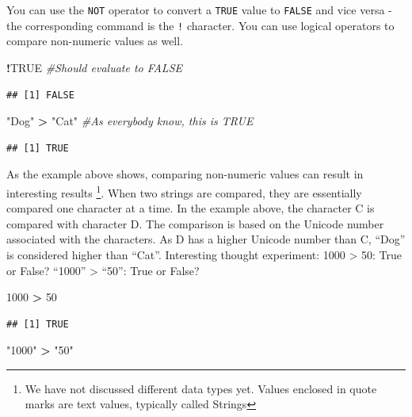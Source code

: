 \documentclass[]{krantz}
\makeatletter
\newenvironment{Shaded}{\begin{snugshade}}{\end{snugshade}}
\newcommand{\DecValTok}[1]{\textcolor[rgb]{0.06,0.06,0.06}{#1}}
\newcommand{\StringTok}[1]{\textcolor[rgb]{0.5,0.5,0.5}{#1}}
\newcommand{\CommentTok}[1]{\textcolor[rgb]{0.56,0.35,0.01}{\textit{#1}}}
\newcommand{\OtherTok}[1]{\textcolor[rgb]{0.56,0.35,0.01}{#1}}
\newcommand{\OperatorTok}[1]{\textcolor[rgb]{0.81,0.36,0.00}{\textbf{#1}}}
\newenvironment{kframe}{%
\medskip{}
\setlength{\fboxsep}{.8em}
 \def\at@end@of@kframe{}%
 \ifinner\ifhmode%
  \def\at@end@of@kframe{\end{minipage}}%
  \begin{minipage}{\columnwidth}%
 \fi\fi%
 \def\FrameCommand##1{\hskip\@totalleftmargin \hskip-\fboxsep
 \colorbox{shadecolor}{##1}\hskip-\fboxsep
     \hskip-\linewidth \hskip-\@totalleftmargin \hskip\columnwidth}%
 \MakeFramed {\advance\hsize-\width
   \@totalleftmargin\z@ \linewidth\hsize
   \@setminipage}}%
 {\par\unskip\endMakeFramed%
 \at@end@of@kframe}
\renewenvironment{Shaded}{\begin{kframe}}{\end{kframe}}
\theoremstyle{definition}
\theoremstyle{definition}
\theoremstyle{definition}
\theoremstyle{remark}
\makeatother
\begin{document}
You can use the \texttt{NOT} operator to convert a \texttt{TRUE} value
to \texttt{FALSE} and vice versa - the corresponding command is the
\texttt{!} character. You can use logical operators to compare
non-numeric values as well.

\begin{Shaded}
\begin{Highlighting}[]
\OperatorTok{!}\OtherTok{TRUE} \CommentTok{#Should evaluate to FALSE}
\end{Highlighting}
\end{Shaded}

\begin{verbatim}
## [1] FALSE
\end{verbatim}

\begin{Shaded}
\begin{Highlighting}[]
\StringTok{"Dog"} \OperatorTok{>}\StringTok{ "Cat"} \CommentTok{#As everybody know, this is TRUE}
\end{Highlighting}
\end{Shaded}

\begin{verbatim}
## [1] TRUE
\end{verbatim}

As the example above shows, comparing non-numeric values can result in
interesting results \footnote{We have not discussed different data types
  yet. Values enclosed in quote marks are text values, typically called
  Strings}. When two strings are compared, they are essentially compared
one character at a time. In the example above, the character C is
compared with character D. The comparison is based on the Unicode number
associated with the characters. As D has a higher Unicode number than C,
``Dog'' is considered higher than ``Cat''. Interesting thought
experiment: 1000 \textgreater{} 50: True or False? ``1000''
\textgreater{} ``50'': True or False?

\begin{Shaded}
\begin{Highlighting}[]
\DecValTok{1000} \OperatorTok{>}\StringTok{ }\DecValTok{50}
\end{Highlighting}
\end{Shaded}

\begin{verbatim}
## [1] TRUE
\end{verbatim}

\begin{Shaded}
\begin{Highlighting}[]
\StringTok{"1000"} \OperatorTok{>}\StringTok{ "50"}
\end{Highlighting}
\end{Shaded}
\end{document}

